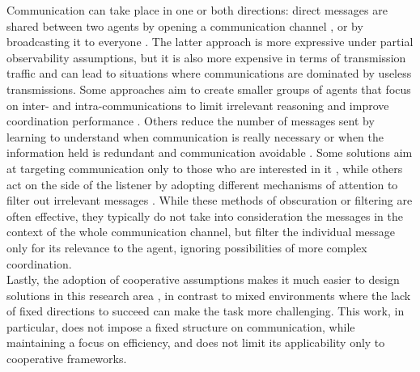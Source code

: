 \documentclass[a4paper,singleside,12pt]{report} %
\begin{document}
Communication can take place in one or both directions: direct messages are shared between two agents by opening a communication channel \cite{Niu2021MultiAgentGC, Zhao2022TargetedMC}, or by broadcasting it to everyone \cite{Kim2021CommunicationIM, Lin2021LearningTG, Sukhbaatar2016LearningMC, Das2018TarMACTM}. The latter approach is more expressive under partial observability assumptions, but it is also more expensive in terms of transmission traffic and can lead to situations where communications are dominated by useless transmissions. Some approaches aim to create smaller groups of agents that focus on inter- and intra-communications to limit irrelevant reasoning and improve coordination performance \cite{Liu2021LearningCF, Niu2021MultiAgentGC, Liu2020When2comMP, Niu2021MultiAgentGC, ATOCJiang2018LearningAC}. Others reduce the number of messages sent by learning to understand when communication is really necessary or when the information held is redundant and communication avoidable \cite{Liu2020When2comMP, Ding2020LearningII}. Some solutions aim at targeting communication only to those who are interested in it \cite{Zhao2022TargetedMC}, while others act on the side of the listener by adopting different mechanisms of attention to filter out irrelevant messages \cite{Li2021LearningED, Kim2021CommunicationIM, Sukhbaatar2016LearningMC, Das2018TarMACTM}. While these methods of obscuration or filtering are often effective, they typically do not take into consideration the messages in the context of the whole communication channel, but filter the individual message only for its relevance to the agent, ignoring possibilities of more complex coordination.\\
Lastly, the adoption of cooperative assumptions makes it much easier to design solutions in this research area \cite{Foerster2017CounterfactualMP, Li2021LearningED, Liu2021LearningCF, Mao2017ACCNetAN, Ding2020LearningII, Sukhbaatar2016LearningMC}, in contrast to mixed environments \cite{Tu2021AdversarialAO, Blumenkamp2020TheEO} where the lack of fixed directions to succeed can make the task more challenging. This work, in particular, does not impose a fixed structure on communication, while maintaining a focus on efficiency, and does not limit its applicability only to cooperative frameworks.
\end{document}
